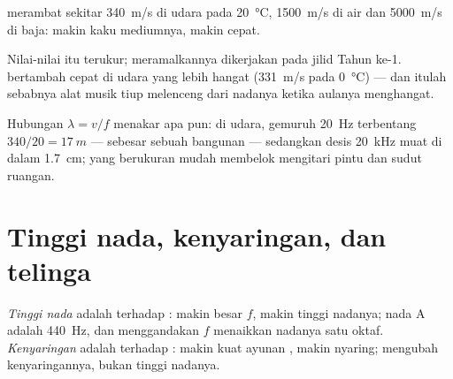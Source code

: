 \begin{proposition}\label{prop:g12:sound-acoustics:speed}
%
 merambat sekitar \qty{340}{m/s} di udara pada
\qty{20}{\degreeCelsius}, \qty{1500}{m/s} di air dan \qty{5000}{m/s} di
baja: makin kaku mediumnya, makin cepat. \admitted
\end{proposition}

\begin{remark}\label{rem:g12:sound-acoustics:temperature}
Nilai-nilai itu terukur; meramalkannya dikerjakan pada jilid Tahun ke-1.
 bertambah cepat di udara yang lebih hangat (\qty{331}{m/s} pada
\qty{0}{\degreeCelsius}) --- dan itulah sebabnya alat musik tiup
melenceng dari nadanya ketika aulanya menghangat.
\end{remark}

\begin{example}\label{ex:g12:sound-acoustics:wavelengths}
Hubungan $\lambda = v/f$ menakar  apa pun: di udara, gemuruh
\qty{20}{Hz} terbentang $340/20 = \qty{17}{m}$ --- sebesar sebuah
bangunan --- sedangkan desis \qty{20}{kHz} muat di dalam \qty{1.7}{cm};
yang berukuran  mudah membelok mengitari pintu dan sudut ruangan.
\end{example}

\section{Tinggi nada, kenyaringan, dan telinga}

\begin{definition}\label{def:g12:sound-acoustics:pitch-loudness}
\emph{Tinggi nada} adalah  terhadap
: makin besar $f$, makin tinggi nadanya; nada A adalah
\qty{440}{Hz}, dan menggandakan $f$ menaikkan nadanya satu oktaf.
\emph{Kenyaringan} adalah  terhadap
: makin kuat ayunan , makin nyaring; 
mengubah kenyaringannya, bukan tinggi nadanya.
\end{definition}

